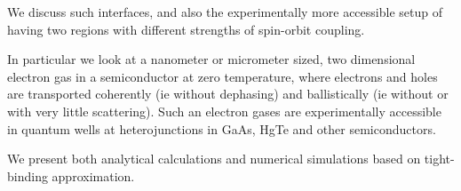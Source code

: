 We discuss such interfaces, and also the experimentally more accessible setup
of having two regions with different strengths of spin-orbit coupling.

In particular we look at a nanometer or micrometer sized, two dimensional
electron gas in a semiconductor at zero temperature, where electrons and holes
are transported coherently (ie without dephasing) and ballistically (ie
without or with very little scattering). Such an electron gases are
experimentally accessible in quantum wells at heterojunctions in GaAs,
HgTe and other semiconductors.

We present both analytical calculations and numerical simulations based on
tight-binding approximation.

